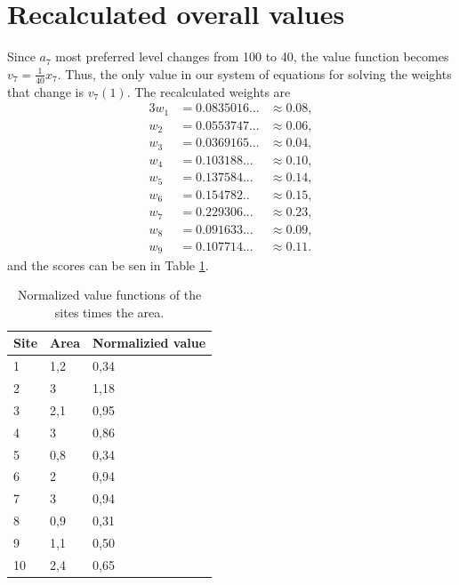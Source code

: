 \documentclass{article}
\begin{document}
\section{Recalculated overall values}
	Since $a_7$ most preferred level changes from 100 to 40, the value function  becomes $v_7=\frac{1}{40}x_7$. Thus, the only value in our system of equations for solving the weights that change is $v_7(1)$. The recalculated weights are
	\begin{alignat}{3}
		w_1&= 0.0835016...& \approx 0.08,\\
		w_2&= 0.0553747...&\approx0.06,\\
		w_3&= 0.0369165...&\approx0.04,\\
		w_4&= 0.103188...&\approx0.10,\\
		w_5&= 0.137584...&\approx0.14,\\
		w_6&= 0.154782..&\approx0.15,\\
		w_7&= 0.229306...&\approx0.23,\\
		w_8&= 0.091633...&\approx0.09,\\
		w_9&= 0.107714...&\approx0.11.
	\end{alignat}
	and the scores can be sen in Table \ref{tab:ex6}.
	\begin{table}[]
		\centering
		\caption{Normalized value functions of the sites times the area.}
		\label{tab:ex6}
		\begin{tabular}{lll}
			\textbf{Site} & \textbf{Area} & \textbf{Normalizied value} \\ \hline
			1             & 1,2           & 0,34                       \\
			2             & 3             & 1,18                       \\
			3             & 2,1           & 0,95                       \\
			4             & 3             & 0,86                       \\
			5             & 0,8           & 0,34                       \\
			6             & 2             & 0,94                       \\
			7             & 3             & 0,94                       \\
			8             & 0,9           & 0,31                       \\
			9             & 1,1           & 0,50                       \\
			10            & 2,4           & 0,65                      
		\end{tabular}
	\end{table}
\end{document}
